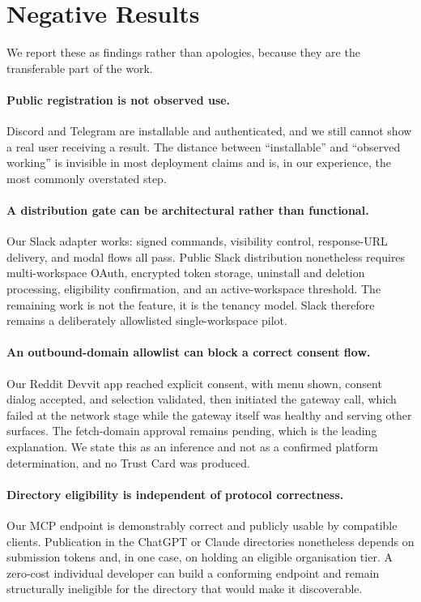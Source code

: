 \section{Negative Results}
\label{sec:negative}

We report these as findings rather than apologies, because they are the transferable part
of the work.

\paragraph{Public registration is not observed use.}
Discord and Telegram are installable and authenticated, and we still cannot show a real
user receiving a result. The distance between ``installable'' and ``observed working'' is
invisible in most deployment claims and is, in our experience, the most commonly overstated
step.

\paragraph{A distribution gate can be architectural rather than functional.}
Our Slack adapter works: signed commands, visibility control, response-URL delivery, and
modal flows all pass. Public Slack distribution nonetheless requires multi-workspace OAuth,
encrypted token storage, uninstall and deletion processing, eligibility confirmation, and
an active-workspace threshold. The remaining work is not the feature, it is the tenancy
model. Slack therefore remains a deliberately allowlisted single-workspace pilot.

\paragraph{An outbound-domain allowlist can block a correct consent flow.}
Our Reddit Devvit app reached explicit consent, with menu shown, consent dialog accepted,
and selection validated, then initiated the gateway call, which failed at the network stage
while the gateway itself was healthy and serving other surfaces. The fetch-domain approval
remains pending, which is the leading explanation. We state this as an inference and not as
a confirmed platform determination, and no Trust Card was produced.

\paragraph{Directory eligibility is independent of protocol correctness.}
Our MCP endpoint is demonstrably correct and publicly usable by compatible clients.
Publication in the ChatGPT or Claude directories nonetheless depends on submission tokens
and, in one case, on holding an eligible organisation tier. A zero-cost individual developer
can build a conforming endpoint and remain structurally ineligible for the directory that
would make it discoverable.

